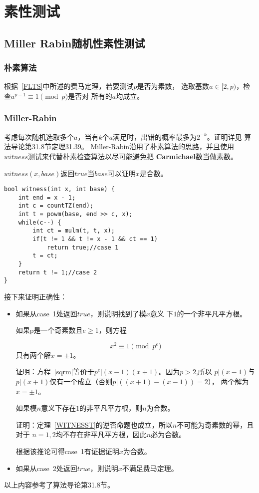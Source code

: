 \section{素性测试}
\subsection{Miller Rabin随机性素性测试}
\subsubsection{朴素算法}
根据~\ref{FLTS}中所述的费马定理，若要测试$p$是否为素数，
选取基数$a\in [2,p)$，检查$a^{p-1}\equiv 1 \pmod{p}$是否对
所有的$a$均成立。
\subsubsection{Miller-Rabin}
考虑每次随机选取多个$a$，当有$k$个$a$满足时，出错的概率最多为$2^{-k}$。证明详见
算法导论\cite{ITA3}第31.8节定理31.39。
Miller-Rabin沿用了朴素算法的思路，并且使用$witness$测试来代替朴素检查算法以尽可能避免把
{\bfseries Carmichael}数当做素数。

$witness(x,base)$返回$true$当$base$可以证明$x$是合数。
\begin{lstlisting}[title=witness]
bool witness(int x, int base) {
    int end = x - 1;
    int c = countTZ(end);
    int t = powm(base, end >> c, x);
    while(c--) {
        int ct = mulm(t, t, x);
        if(t != 1 && t != x - 1 && ct == 1)
            return true;//case 1
        t = ct;
    }
    return t != 1;//case 2
}
\end{lstlisting}
接下来证明正确性：
\begin{itemize}
	\item 如果从case~1处返回$true$，则说明找到了模$x$意义
            下$1$的一个非平凡平方根。

          \begin{theorem}\label{WITNESST}
              如果p是一个奇素数且$e\geq 1$，则方程

              \begin{equation}\label{sqrm}
                   x^2 \equiv 1 \pmod{p^e}
              \end{equation}
              只有两个解$x=\pm 1$。
	      \end{theorem}

          证明：方程~\ref{sqrm}等价于$p^e|(x-1)(x+1)$。因为$p>2$,所以
          $p|(x-1)$与$p|(x+1)$仅有一个成立（否则$p|((x+1)-(x-1))=2$），
          两个解为$x=\pm 1$。

	      \begin{inference}
		      如果模$n$意义下存在$1$的非平凡平方根，则$n$为合数。
	      \end{inference}

	      证明：定理~\ref{WITNESST}的逆否命题也成立，所以$n$不可能为奇素数的幂，且对于
	      $n=1,2$均不存在非平凡平方根，因此$n$必为合数。

	      根据该推论可得case~1有证据证明$x$为合数。
	\item 如果从case~2处返回$true$，则说明$x$不满足费马定理。
\end{itemize}
以上内容参考了算法导论\cite{ITA3}第31.8节。
